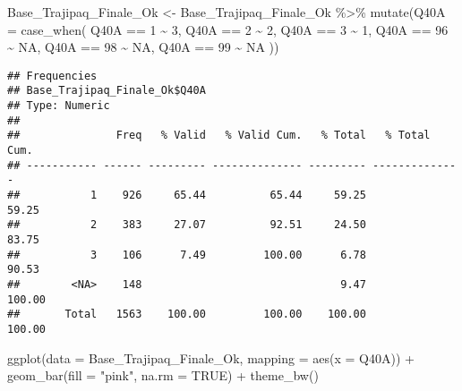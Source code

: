 \documentclass[
]{article}
\newenvironment{Shaded}{\begin{snugshade}}{\end{snugshade}}
\newcommand{\AttributeTok}[1]{\textcolor[rgb]{0.77,0.63,0.00}{#1}}
\newcommand{\ConstantTok}[1]{\textcolor[rgb]{0.00,0.00,0.00}{#1}}
\newcommand{\DecValTok}[1]{\textcolor[rgb]{0.00,0.00,0.81}{#1}}
\newcommand{\FunctionTok}[1]{\textcolor[rgb]{0.00,0.00,0.00}{#1}}
\newcommand{\NormalTok}[1]{#1}
\newcommand{\OtherTok}[1]{\textcolor[rgb]{0.56,0.35,0.01}{#1}}
\newcommand{\SpecialCharTok}[1]{\textcolor[rgb]{0.00,0.00,0.00}{#1}}
\newcommand{\StringTok}[1]{\textcolor[rgb]{0.31,0.60,0.02}{#1}}
\begin{document}
\begin{Shaded}
\begin{Highlighting}[]
\NormalTok{Base\_Trajipaq\_Finale\_Ok }\OtherTok{\textless{}{-}}
\NormalTok{  Base\_Trajipaq\_Finale\_Ok }\SpecialCharTok{\%\textgreater{}\%}
  \FunctionTok{mutate}\NormalTok{(}\AttributeTok{Q40A =} \FunctionTok{case\_when}\NormalTok{(}
\NormalTok{    Q40A }\SpecialCharTok{==} \DecValTok{1} \SpecialCharTok{\textasciitilde{}} \DecValTok{3}\NormalTok{,}
\NormalTok{    Q40A }\SpecialCharTok{==} \DecValTok{2} \SpecialCharTok{\textasciitilde{}} \DecValTok{2}\NormalTok{,}
\NormalTok{    Q40A }\SpecialCharTok{==} \DecValTok{3} \SpecialCharTok{\textasciitilde{}} \DecValTok{1}\NormalTok{,}
\NormalTok{    Q40A }\SpecialCharTok{==} \DecValTok{96} \SpecialCharTok{\textasciitilde{}} \ConstantTok{NA}\NormalTok{,}
\NormalTok{    Q40A }\SpecialCharTok{==} \DecValTok{98} \SpecialCharTok{\textasciitilde{}} \ConstantTok{NA}\NormalTok{,}
\NormalTok{    Q40A }\SpecialCharTok{==} \DecValTok{99} \SpecialCharTok{\textasciitilde{}} \ConstantTok{NA}
\NormalTok{  ))}
\end{Highlighting}
\end{Shaded}

\begin{Shaded}
\end{Shaded}

\begin{verbatim}
## Frequencies  
## Base_Trajipaq_Finale_Ok$Q40A  
## Type: Numeric  
## 
##               Freq   % Valid   % Valid Cum.   % Total   % Total Cum.
## ----------- ------ --------- -------------- --------- --------------
##           1    926     65.44          65.44     59.25          59.25
##           2    383     27.07          92.51     24.50          83.75
##           3    106      7.49         100.00      6.78          90.53
##        <NA>    148                               9.47         100.00
##       Total   1563    100.00         100.00    100.00         100.00
\end{verbatim}

\begin{Shaded}
\begin{Highlighting}[]
\FunctionTok{ggplot}\NormalTok{(}\AttributeTok{data =}\NormalTok{ Base\_Trajipaq\_Finale\_Ok, }\AttributeTok{mapping =} \FunctionTok{aes}\NormalTok{(}\AttributeTok{x =}\NormalTok{ Q40A)) }\SpecialCharTok{+}
  \FunctionTok{geom\_bar}\NormalTok{(}\AttributeTok{fill =} \StringTok{"pink"}\NormalTok{, }\AttributeTok{na.rm =} \ConstantTok{TRUE}\NormalTok{) }\SpecialCharTok{+}
  \FunctionTok{theme\_bw}\NormalTok{()}
\end{Highlighting}
\end{Shaded}
\end{document}
